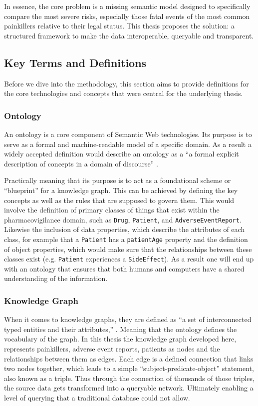 In essence, the core problem is a missing semantic model designed to specifically compare the most severe risks, especially those fatal events of the most common painkillers relative to their legal status. This thesis proposes the solution: a structured framework to make the data interoperable, queryable and transparent.
\subsection{Key Terms and Definitions}
Before we dive into the methodology, this section aims to provide definitions for the core technologies and concepts that were central for the underlying thesis. 
\subsubsection{Ontology}
An ontology is a core component of Semantic Web technologies. Its purpose is to serve as a formal and machine-readable model of a specific domain. As a result a widely accepted definition would describe an ontology as a “a formal explicit description of concepts in a domain of discourse” \cite{Noy2001}.

Practically meaning that its purpose is to act as a foundational scheme or “blueprint” for a knowledge graph. This can be achieved by defining the key concepts as well as the rules that are supposed to govern them. This would involve the definition of primary classes of things that exist within the pharmacovigilance domain, such as \texttt{Drug}, \texttt{Patient}, and \texttt{AdverseEventReport}. Likewise the inclusion of data properties, which describe the attributes of each class, for example that a \texttt{Patient} has a \texttt{patientAge} property and the definition of object properties, which would make sure that the relationships between these classes exist (e.g. \texttt{Patient} experiences a \texttt{SideEffect}). As a result one will end up with an ontology that ensures that both humans and computers have a shared understanding of the information.
\subsubsection{Knowledge Graph}
When it comes to knowledge graphs, they are defined as “a set of interconnected typed entities and their attributes,” \cite{Pan2017exploiting}. Meaning that the ontology defines the vocabulary of the graph. In this thesis the knowledge graph developed here, represents painkillers, adverse event reports, patients as nodes and the relationships between them as edges. Each edge is a defined connection that links two nodes together, which leads to a simple “subject-predicate-object” statement, also known as a triple. Thus through the connection of thousands of those triples, the source data gets transformed into a queryable network. Ultimately enabling a level of querying that a traditional database could not allow. 
